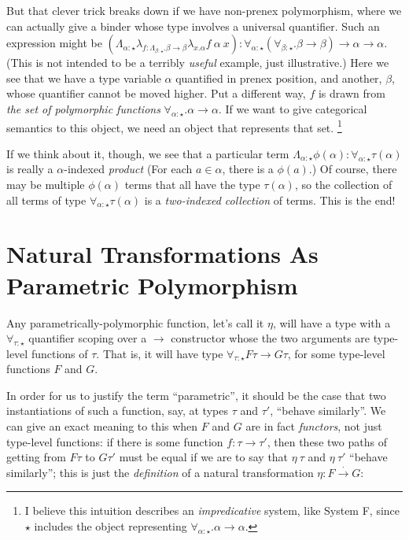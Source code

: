 \documentclass[letterpaper]{article}
\begin{document}
But that clever trick breaks down if we have non-prenex polymorphism, where
we can actually give a binder whose type involves a universal quantifier.
Such an expression might be $(\Lambda_{\alpha : \star} \lambda_{f :
\Lambda_{\beta : \star} . \beta \to \beta} \lambda_{x . \alpha} f~\alpha~x)
: \forall_{\alpha : \star} (\forall_{\beta : \star} . \beta \to \beta) \to
\alpha \to \alpha$.  (This is not intended to be a terribly {\em useful}
example, just illustrative.)  Here we see that we have a type variable
$\alpha$ quantified in prenex position, and another, $\beta$, whose
quantifier cannot be moved higher.  Put a different way, $f$ is drawn from
{\em the set of polymorphic functions} $\forall_{\alpha : \star} . \alpha
\to \alpha$.  If we want to give categorical semantics to this object, we
need an object that represents that set.%
%
\footnote{I believe this intuition describes an {\em impredicative} system,
like System F, since $\star$ includes the object representing
$\forall_{\alpha : \star} . \alpha \to \alpha$.}

If we think about it, though, we see that a particular term $\Lambda_{\alpha
: \star} \phi(\alpha) : \forall_{\alpha : \star} \tau(\alpha)$ is really a
$\alpha$-indexed {\em product} (For each $a \in \alpha$, there is a
$\phi(a)$.)  Of course, there may be multiple $\phi(\alpha)$ terms that all
have the type $\tau(\alpha)$, so the collection of all terms of type
$\forall_{\alpha : \star} \tau(\alpha)$ is a {\em two-indexed collection} of
terms.  This is the end!

\section{Natural Transformations As Parametric Polymorphism}

Any parametrically-polymorphic function, let's call it $\eta$, will have a
type with a $\forall_{\tau : \star}$ quantifier scoping over a $\to$
constructor whose the two arguments are type-level functions of $\tau$.
That is, it will have type $\forall_{\tau : \star} F \tau \to G \tau$, for
some type-level functions $F$ and $G$.


In order for us to justify the term ``parametric'', it should be the case
that two instantiations of such a function, say, at types $\tau$ and
$\tau'$, ``behave similarly''.  We can give an exact meaning to this when
$F$ and $G$ are in fact {\em functors}, not just type-level functions: if
there is some function $f : \tau \to \tau'$, then these two paths of getting
from $F \tau$ to $G \tau'$ must be equal if we are to say that $\eta~\tau$
and $\eta~\tau'$ ``behave similarly''; this is just the {\em definition} of
a natural transformation $\eta : F \stackrel{\cdot}{\to} G$:
\end{document}
